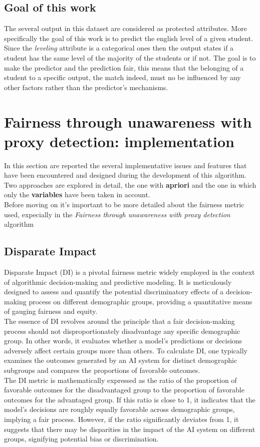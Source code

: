 \documentclass[12pt,a4paper,openright,twoside]{book}
\begin{document}
\subsection{Goal of this work}
The several output in this dataset are considered as protected attributes. More specifically the goal of this work is to predict the english level of a given student. Since the \emph{level\textunderscore ing} attribute is a categorical ones then the output states if a student has the same level of the majority of the students or if not. The goal is to make the predictor and the prediction fair, this means that the belonging of a student to a specific output, the match indeed, must no be influenced by any other factors rather than the predictor's mechanisms.
\newpage
\section{Fairness through unawareness with proxy detection: implementation}
In this section are reported the several implementative issues and features that have been encountered and designed during the development of this algorithm. Two approaches are explored in detail, the one with \textbf{apriori} and the one in which only the \textbf{variables} have been taken in account. \\
Before moving on it's important to be more detailed about the fairness metric used, expecially in the \emph{Fairness through unawareness with proxy detection} algorithm 
\subsection{Disparate Impact}
Disparate Impact (DI) is a pivotal fairness metric widely employed in the context of algorithmic decision-making and predictive modeling. It is meticulously designed to assess and quantify the potential discriminatory effects of a decision-making process on different demographic groups, providing a quantitative means of gauging fairness and equity. \\
The essence of DI revolves around the principle that a fair decision-making process should not disproportionately disadvantage any specific demographic group. In other words, it evaluates whether a model's predictions or decisions adversely affect certain groups more than others. To calculate DI, one typically examines the outcomes generated by an AI system for distinct demographic subgroups and compares the proportions of favorable outcomes. \\
The DI metric is mathematically expressed as the ratio of the proportion of favorable outcomes for the disadvantaged group to the proportion of favorable outcomes for the advantaged group. If this ratio is close to 1, it indicates that the model's decisions are roughly equally favorable across demographic groups, implying a fair process. However, if the ratio significantly deviates from 1, it suggests that there may be disparities in the impact of the AI system on different groups, signifying potential bias or discrimination.
\end{document}
